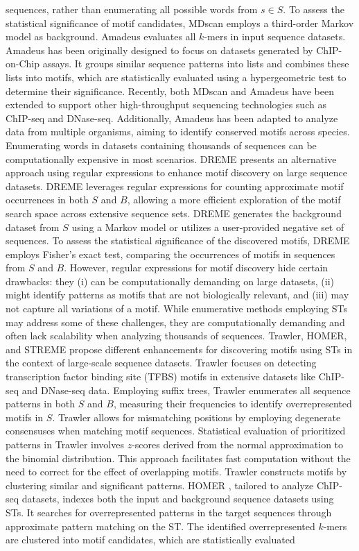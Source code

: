 \documentclass[a4paper, titlepage, openright]{book}
\begin{document}
sequences, rather than enumerating all possible words from $s \in S$. To assess the statistical significance of motif candidates, MDscan employs a third-order Markov model as background. Amadeus \citep{linhart2008transcription} evaluates all $k$-mers in input sequence datasets. Amadeus has been originally designed to focus on datasets generated by ChIP-on-Chip assays. It groups similar sequence patterns into lists and combines these lists into motifs, which are statistically evaluated using a hypergeometric test to determine their significance. Recently, both MDscan and Amadeus have been extended to support other high-throughput sequencing technologies such as ChIP-seq and DNase-seq. Additionally, Amadeus has been adapted to analyze data from multiple organisms, aiming to identify conserved motifs across species. Enumerating words in datasets containing thousands of sequences can be computationally expensive in most scenarios. DREME \citep{bailey2011dreme} presents an alternative approach using regular expressions to enhance motif discovery on large sequence datasets. DREME leverages regular expressions for counting approximate motif occurrences in both $S$ and $B$, allowing a more efficient exploration of the motif search space across extensive sequence sets. DREME generates the background dataset from $S$ using a Markov model or utilizes a user-provided negative set of sequences. To assess the statistical significance of the discovered motifs, DREME employs Fisher’s exact test, comparing the occurrences of motifs in sequences from $S$ and $B$. However, regular expressions for motif discovery hide certain drawbacks: they (i) can be computationally demanding on large datasets, (ii) might identify patterns as motifs that are not biologically relevant, and (iii) may not capture all variations of a motif. While enumerative methods employing STs may address some of these challenges, they are computationally demanding and often lack scalability when analyzing thousands of sequences. Trawler, HOMER, and STREME \citep{ettwiller2007trawler,heinz2010simple,bailey2021streme} propose different enhancements for discovering motifs using STs in the context of large-scale sequence datasets. Trawler \citep{ettwiller2007trawler} focuses on detecting transcription factor binding site (TFBS) motifs in extensive datasets like ChIP-seq and DNase-seq data. Employing suffix trees, Trawler enumerates all sequence patterns in both $S$ and $B$, measuring their frequencies to identify overrepresented motifs in $S$. Trawler allows for mismatching positions by employing degenerate consensuses when matching motif sequences. Statistical evaluation of prioritized patterns in Trawler involves $z$-scores derived from the normal approximation to the binomial distribution. This approach facilitates fast computation without the need to correct for the effect of overlapping motifs. Trawler constructs motifs by clustering similar and significant patterns. HOMER \citep{heinz2010simple}, tailored to analyze ChIP-seq datasets, indexes both the input and background sequence datasets using STs. It searches for overrepresented patterns in the target sequences through approximate pattern matching on the ST. The identified overrepresented $k$-mers are clustered into motif candidates, which are statistically evaluated 
\end{document}
